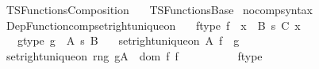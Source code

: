 %
\begin{isabellebody}%
%
%
\isadelimdocument
%
\endisadelimdocument
%
\isatagdocument
%
\isamarkuptrue%
%
\endisatagdocument
{\isafolddocument}%
%
\isadelimdocument
%
\endisadelimdocument
%
\isadelimtheory
%
\endisadelimtheory
%
\isatagtheory
{}\isamarkupfalse%
\ TSFunctions{\isacharunderscore}{\kern0pt}Composition\isanewline
\ \ \ TSFunctions{\isacharunderscore}{\kern0pt}Base\isanewline
{}%
\endisatagtheory
{\isafoldtheory}%
%
\isadelimtheory
\isanewline
%
\endisadelimtheory
\isanewline
{}\isamarkupfalse%
\ no{\isacharunderscore}{\kern0pt}comp{\isacharunderscore}{\kern0pt}syntax\isanewline
\isanewline
{}\isamarkupfalse%
\ Dep{\isacharunderscore}{\kern0pt}Function{\isacharunderscore}{\kern0pt}comp{\isacharunderscore}{\kern0pt}set{\isacharunderscore}{\kern0pt}right{\isacharunderscore}{\kern0pt}unique{\isacharunderscore}{\kern0pt}on{\isacharcolon}{\kern0pt}\isanewline
\ \ \ f{\isacharunderscore}{\kern0pt}type{\isacharcolon}{\kern0pt}\ {\isachardoublequoteopen}f\ {\isacharcolon}{\kern0pt}\ {\isacharparenleft}{\kern0pt}x\ {\isacharcolon}{\kern0pt}\ B{\isacharparenright}{\kern0pt}\ {\isasymrightarrow}s\ {\isacharparenleft}{\kern0pt}C\ x{\isacharparenright}{\kern0pt}{\isachardoublequoteclose}\isanewline
\ \ \ g{\isacharunderscore}{\kern0pt}type{\isacharcolon}{\kern0pt}\ {\isachardoublequoteopen}g\ {\isacharcolon}{\kern0pt}\ A\ {\isasymrightarrow}s\ B{\isachardoublequoteclose}\isanewline
\ \ \ {\isachardoublequoteopen}set{\isacharunderscore}{\kern0pt}right{\isacharunderscore}{\kern0pt}unique{\isacharunderscore}{\kern0pt}on\ A\ {\isacharparenleft}{\kern0pt}f\ {\isasymcirc}\ g{\isacharparenright}{\kern0pt}{\isachardoublequoteclose}\isanewline
%
\isadelimproof
%
\endisadelimproof
%
\isatagproof
{}\isamarkupfalse%
\ {\isacharminus}{\kern0pt}\isanewline
\ \ \isamarkupfalse%
\ {\isachardoublequoteopen}set{\isacharunderscore}{\kern0pt}right{\isacharunderscore}{\kern0pt}unique{\isacharunderscore}{\kern0pt}on\ {\isacharparenleft}{\kern0pt}rng\ g{\isasymrestriction}\isactrlbsub A\isactrlesub \ {\isasyminter}\ dom\ f{\isacharparenright}{\kern0pt}\ f{\isachardoublequoteclose}\isanewline
\ \ \isamarkupfalse%
\ {\isacharminus}{\kern0pt}\isanewline
\ \ \ \ \isamarkupfalse%
\ f{\isacharunderscore}{\kern0pt}type\ \isamarkupfalse%

\end{isabellebody}
